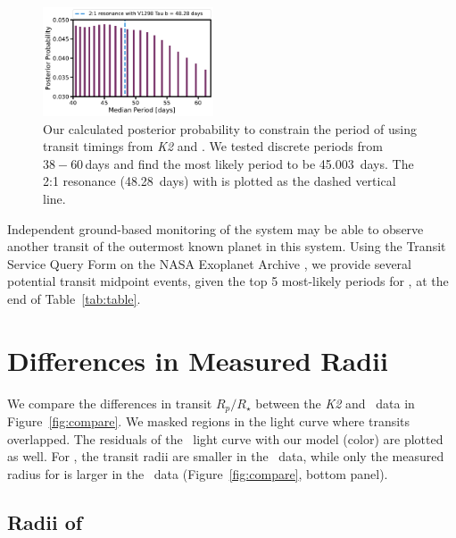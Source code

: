 \documentclass[linenumbers,modern,twocolumn]{aastex631}
\begin{document}
\begin{figure}[!ht]
\begin{center}
\includegraphics[width=0.45\textwidth,trim={0.25cm 0 0cm 0}]{static/periode.pdf}
\caption{Our calculated posterior probability to constrain the period of \planete using transit timings from \textit{K2} and \tess. We tested discrete periods from $38-60$\,days and find the most likely period to be 45.003~days. The 2:1 resonance (48.28~days) with \planetb is plotted as the dashed vertical line. \href{https://github.com/afeinstein20/v1298tau_tess/blob/main/notebooks/V1298Tau_e.py}{\github}} \label{fig:period_e}
\end{center}
\end{figure}

Independent ground-based monitoring of the system may be able to observe another transit of the outermost known planet in this system. Using the Transit Service Query Form on the NASA Exoplanet Archive \citep{Akeson2013}, we provide several potential transit midpoint events, given the top 5 most-likely periods for \planete, at the end of Table~\ref{tab:table}.

\section{Differences in Measured Radii} \label{sec:radii}

We compare the differences in transit $R_p/R_\star$ between the \textit{K2} and \tess\ data in Figure~\ref{fig:compare}. We masked regions in the light curve where transits overlapped. The residuals of the \tess\ light curve with our model (color) are plotted as well. For \planetknown, the transit radii are smaller in the \tess\ data, while only the measured radius for \planete is larger in the \tess\ data (Figure~\ref{fig:compare}, bottom panel).


\subsection{Radii of \planetknown}
\end{document}
